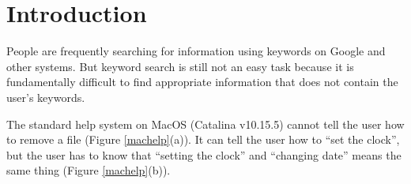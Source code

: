 \documentclass[manuscript,anonymous,review]{acmart}
\begin{document}



\maketitle

\section{Introduction}

People are frequently searching for information using keywords on Google
and other systems.
But keyword search is still not an easy task because it is
fundamentally difficult to find appropriate information that does not
contain the user's keywords.


The standard help system on MacOS (Catalina v10.15.5)
cannot tell the user how to remove a file (Figure \ref{machelp}(a)).
%
It can tell the user how to ``set the clock'', but
the user has to know that
``setting the clock'' and ``changing date'' means the same thing (Figure \ref{machelp}(b)).
\end{document}
